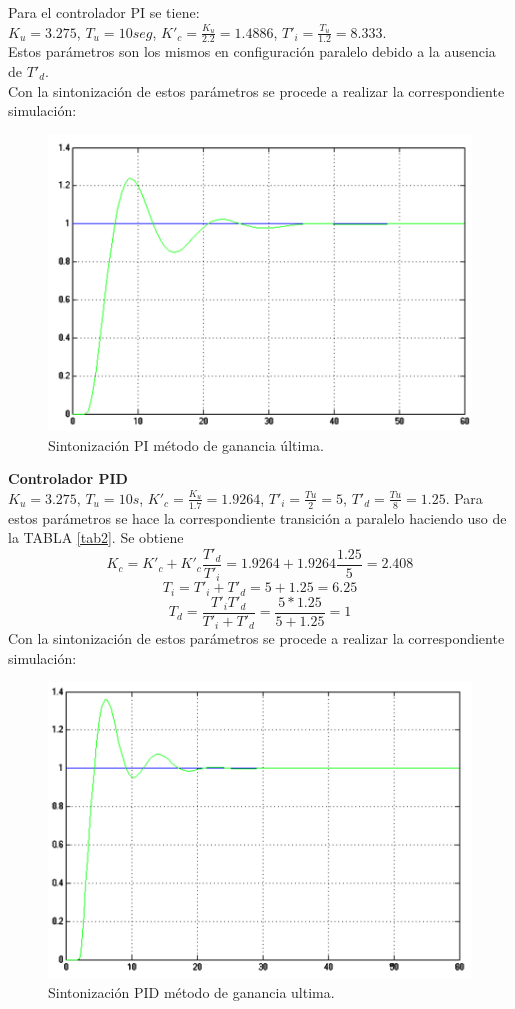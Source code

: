 \documentclass[twocolumn]{IEEEtran}
\begin{document}
\noindent
Para el controlador PI se tiene:\\
$K_u = 3.275$, $T_u=10seg$, $K'_c= \frac{K_u}{2.2}=1.4886$, $T'_i=\frac{T_u}{1.2}=8.333$.\\
Estos parámetros son los mismos en configuración paralelo debido a la ausencia de $T'_d$.\\
Con la sintonización de estos parámetros se procede a realizar la correspondiente simulación:
\begin{figure}[H]
	\centering
		\includegraphics[scale=0.27]{figura1.png}
	\caption{Sintonización PI método de ganancia última.}
	\label{fig31}
\end{figure}
\noindent
\textbf{Controlador PID}\\
$K_u= 3.275$, $T_u=10s$, $K'_c= \frac{K_u}{1.7} =  1.9264$, $T'_i = \frac{Tu}{2} =  5$, $T'_d = \frac{Tu}{8} =  1.25$. Para estos parámetros se hace la correspondiente transición a paralelo haciendo uso de la TABLA \ref{tab2}. Se obtiene
$$K_c=  K'_c+ K'_c\frac{T'_d}{T'_i}= 1.9264+  1.9264\frac{1.25}{5}= 2.408$$
$$T_i= T'_i + T'_d = 5 + 1.25 = 6.25$$
$$T_d= \frac{T'_iT'_d}{T'_i + T'_d} = \frac{5*1.25}{5+1.25}= 1 $$
Con la sintonización de estos parámetros se procede a realizar la correspondiente simulación:
\begin{figure}[H]
	\centering
		\includegraphics[scale=0.27]{figura2.png}
	\caption{Sintonización PID método de ganancia ultima.}
	\label{fig32}
\end{figure}
\end{document}
